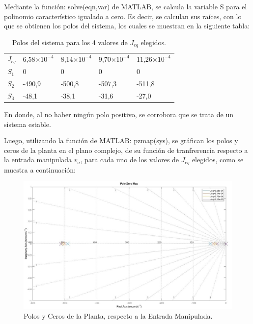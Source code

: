 \documentclass{article}
\begin{document}
\begin{sloppypar}
\hfill

Mediante la función: solve(eqn,var) de MATLAB, se calcula la variable S para el polinomio característico igualado a cero. Es decir, se calculan sus raíces, con lo que se obtienen los polos del sistema, los cuales se muestran en la siguiente tabla:

\begin{table}[H]
    \centering
    \begin{tabular}{|l|llll|}
    \cline{1-5}
    \textbf{$J_{eq}$} & 6,58$\times10^{-4}$ & 8,14$\times10^{-4}$  & 9,70$\times10^{-4}$  & 11,26$\times10^{-4}$ \\ \cline{1-5}
    \textbf{$S_1$}    &    0                &    0                 &    0                 &    0                 \\ \cline{1-5}
    \textbf{$S_2$}    & -490,9              & -500,8               & -507,3               & -511,8               \\ \cline{1-5}
    \textbf{$S_3$}    &  -48,1              &  -38,1               &  -31,6               &  -27,0               \\ \cline{1-5}
    \end{tabular}
    \caption{\label{table:Polos del sistema para los 4 valores de Jeq elegidos}Polos del sistema para los 4 valores de $J_{eq}$ elegidos.}
\end{table}

En donde, al no haber ningún polo positivo, se corrobora que se trata de un sistema estable.

Luego, utilizando la función de MATLAB: pzmap(sys), se gráfican los polos y ceros de la planta en el plano complejo, de su función de tranfrerencia respecto a la entrada manipulada $v_a$, para cada uno de los valores de $J_{eq}$ elegidos, como se muestra a continuación:

\begin{figure}[H]
    \centering
    \includegraphics[width=1\textwidth]{Polos y Ceros de la Planta, respecto a la Entrada Manipulada}
    \caption{Polos y Ceros de la Planta, respecto a la Entrada Manipulada.}
    \label{fig:Polos y Ceros de la Planta, respecto a la Entrada Manipulada}
\end{figure}


\end{sloppypar}
\end{document}

